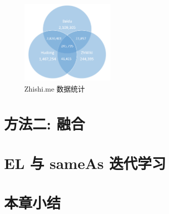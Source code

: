 \begin{figure}[htbp]
\centering
\includegraphics[width=0.4\textwidth]{img/zhishime_data}
\caption{Zhishi.me 数据统计}
\label{zhishime_data}
\end{figure}




\section{方法二: 融合}

\section{EL 与 sameAs 迭代学习}

\section{本章小结}
